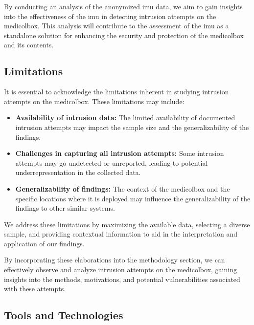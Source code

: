 \documentclass[../main.tex]{subfiles}
\begin{document}
    \clearpage

    By conducting an analysis of the anonymized \gls{imu} data,
    we aim to gain insights into the effectiveness of the
    \gls{imu} in detecting \gls{intrusion} attempts on the \gls{medicolbox}.
    This analysis will contribute to the assessment of the \gls{imu} as a
    standalone solution for enhancing the security and
    protection of the \gls{medicolbox} and its contents.

    \subsection{Limitations}        
    It is essential to acknowledge the limitations inherent in
    studying \gls{intrusion} attempts on the \gls{medicolbox}.
    These limitations may include:
        
    \begin{itemize}
        \item \textbf{Availability of \gls{intrusion} data:} The limited availability of documented \gls{intrusion} attempts may impact the sample size and the generalizability of the findings.

        \item \textbf{Challenges in capturing all \gls{intrusion} attempts:} Some \gls{intrusion} attempts may go undetected or unreported, leading to potential underrepresentation in the collected data.

        \item \textbf{Generalizability of findings:} The context of the \gls{medicolbox} and the specific locations where it is deployed may influence the generalizability of the findings to other similar systems.
    \end{itemize}
    
    We address these limitations by maximizing the available data,
    selecting a diverse sample, and providing contextual information to aid in the
    interpretation and application of our findings.
    
    By incorporating these elaborations into the methodology section,
    we can effectively observe and analyze \gls{intrusion} attempts on the
    \gls{medicolbox}, gaining insights into the methods,
    motivations, and potential vulnerabilities associated with these attempts.
    \subsection{Tools and Technologies}
\end{document}
